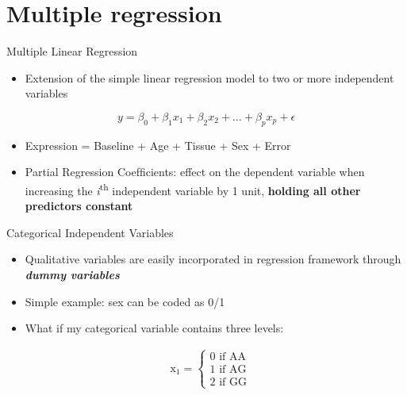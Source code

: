\documentclass[australian,ignorenonframetext,aspectratio=169]{beamer}
\providecommand{\tightlist}{%
  \setlength{\itemsep}{0pt}\setlength{\parskip}{0pt}}
\begin{document}
\begin{frame}{}
\protect\hypertarget{section-1}{}

\section{Multiple regression}

\end{frame}

\begin{frame}{Multiple Linear Regression}
\protect\hypertarget{multiple-linear-regression}{}

\begin{itemize}
\tightlist
\item
  Extension of the simple linear regression model to two or more
  independent variables
\end{itemize}

\[y = \beta_0 + \beta_1x_1 + \beta_2x_2 + \dots + \beta_px_p + \epsilon\]

\begin{itemize}
\item
  Expression = Baseline + Age + Tissue + Sex + Error
\item
  Partial Regression Coefﬁcients: effect on the dependent variable when
  increasing the \emph{i}\textsuperscript{th} independent variable by 1
  unit, \textbf{holding all other predictors constant}
\end{itemize}

\end{frame}

\begin{frame}{Categorical Independent Variables}
\protect\hypertarget{categorical-independent-variables}{}

\begin{itemize}
\item
  Qualitative variables are easily incorporated in regression framework
  through \textbf{\emph{dummy variables}}
\item
  Simple example: sex can be coded as 0/1
\item
  What if my categorical variable contains three levels:
\end{itemize}

\[
\begin{aligned}
& \mathrm{x}_{1}=\left\{\begin{array}{l}0 \text { if } \mathrm{AA} 
                  \\1 \text { if } \mathrm{AG} 
                  \\2 \text { if } \mathrm{GG}\end{array}\right. 
\end{aligned}
\]

\end{frame}
\end{document}
